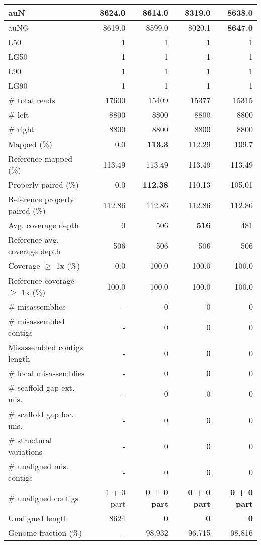 \documentclass[12pt,a4paper]{article}
\begin{document}
\begin{table}[ht]
\begin{center}
\begin{tabular}{|l*{4}{|r}|}
auN & 8624.0 & 8614.0 & 8319.0 & {\bf 8638.0} \\ \hline
auNG & 8619.0 & 8599.0 & 8020.1 & {\bf 8647.0} \\ \hline
L50 & 1 & 1 & 1 & 1 \\ \hline
LG50 & 1 & 1 & 1 & 1 \\ \hline
L90 & 1 & 1 & 1 & 1 \\ \hline
LG90 & 1 & 1 & 1 & 1 \\ \hline
\# total reads & 17600 & 15409 & 15377 & 15315 \\ \hline
\# left & 8800 & 8800 & 8800 & 8800 \\ \hline
\# right & 8800 & 8800 & 8800 & 8800 \\ \hline
Mapped (\%) & 0.0 & {\bf 113.3} & 112.29 & 109.7 \\ \hline
Reference mapped (\%) & 113.49 & 113.49 & 113.49 & 113.49 \\ \hline
Properly paired (\%) & 0.0 & {\bf 112.38} & 110.13 & 105.01 \\ \hline
Reference properly paired (\%) & 112.86 & 112.86 & 112.86 & 112.86 \\ \hline
Avg. coverage depth & 0 & 506 & {\bf 516} & 481 \\ \hline
Reference avg. coverage depth & 506 & 506 & 506 & 506 \\ \hline
Coverage $\geq$ 1x (\%) & 0.0 & 100.0 & 100.0 & 100.0 \\ \hline
Reference coverage $\geq$ 1x (\%) & 100.0 & 100.0 & 100.0 & 100.0 \\ \hline
\# misassemblies & - & 0 & 0 & 0 \\ \hline
\# misassembled contigs & - & 0 & 0 & 0 \\ \hline
Misassembled contigs length & - & 0 & 0 & 0 \\ \hline
\# local misassemblies & - & 0 & 0 & 0 \\ \hline
\# scaffold gap ext. mis. & - & 0 & 0 & 0 \\ \hline
\# scaffold gap loc. mis. & - & 0 & 0 & 0 \\ \hline
\# structural variations & - & 0 & 0 & 0 \\ \hline
\# unaligned mis. contigs & - & 0 & 0 & 0 \\ \hline
\# unaligned contigs & 1 + 0 part & {\bf 0 + 0 part} & {\bf 0 + 0 part} & {\bf 0 + 0 part} \\ \hline
Unaligned length & 8624 & {\bf 0} & {\bf 0} & {\bf 0} \\ \hline
Genome fraction (\%) & - & 98.932 & 96.715 & 98.816 \\ \hline

\end{tabular}
\end{center}
\end{table}
\end{document}

